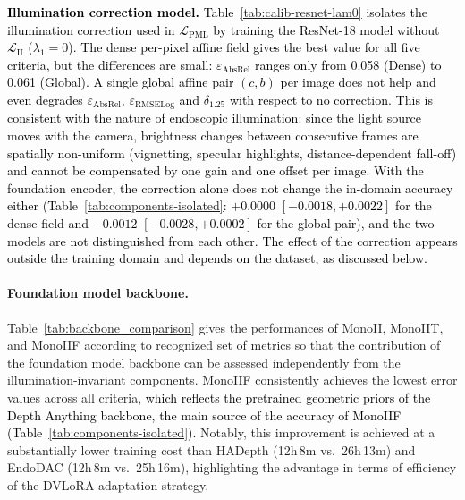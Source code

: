 \documentclass[a4paper,fleqn]{cas-dc}
\begin{document}
{\noindent\textcolor{black}{{\bf Illumination correction model.}
Table~\ref{tab:calib-resnet-lam0} isolates the illumination correction used in $\mathcal{L}_\textrm{PML}$ by training the ResNet-18 model without $\mathcal{L}_\textrm{II}$ ($\lambda_1=0$). The dense per-pixel affine field gives the best value for all five criteria, but the differences are small: $\varepsilon_\textrm{AbsRel}$ ranges only from 0.058 (Dense) to 0.061 (Global). A single global affine pair $(c,b)$ per image does not help and even degrades $\varepsilon_\textrm{AbsRel}$, $\varepsilon_\textrm{RMSELog}$ and $\delta_{1.25}$ with respect to no correction. This is consistent with the nature of endoscopic illumination: since the light source moves with the camera, brightness changes between consecutive frames are spatially non-uniform (vignetting, specular highlights, distance-dependent fall-off) and cannot be compensated by one gain and one offset per image.
\textcolor{black}{With the foundation encoder, the correction alone does not change the in-domain accuracy either (Table~\ref{tab:components-isolated}: $+0.0000$ $[-0.0018, +0.0022]$ for the dense field and $-0.0012$ $[-0.0028, +0.0002]$ for the global pair), and the two models are not distinguished from each other. The effect of the correction appears outside the training domain and depends on the dataset, as discussed below.}}
%
\paragraph{Foundation model backbone.}

Table~\ref{tab:backbone_comparison} gives the performances of MonoII, MonoIIT, and MonoIIF according to recognized set of metrics so that the contribution of the foundation model backbone can be  assessed independently from the illumination-invariant components. MonoIIF consistently achieves the lowest error values across all criteria, \textcolor{black}{which reflects the pretrained geometric priors of the Depth Anything backbone, the main source of the accuracy of MonoIIF (Table~\ref{tab:components-isolated}).} Notably, this improvement is achieved at a substantially lower training cost than HADepth (12h\,8m vs.\ 26h\,13m) and EndoDAC (12h\,8m vs.\ 25h\,16m), highlighting the  advantage in terms of efficiency of the DVLoRA adaptation strategy.
\vspace*{1mm} \\

%
\textcolor{black}
{
}}
\end{document}
